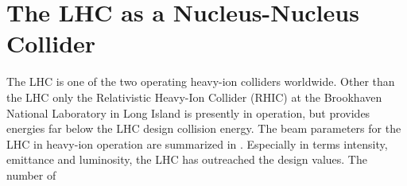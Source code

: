 
\section{The LHC as a Nucleus-Nucleus Collider}

The LHC is one of the two operating heavy-ion colliders worldwide. Other than the LHC only the Relativistic Heavy-Ion Collider (RHIC) at the Brookhaven National Laboratory in Long Island is presently in operation, but provides energies far below the LHC design collision energy. The beam parameters for the LHC in heavy-ion operation are summarized in . Especially in terms intensity, emittance and luminosity, the LHC has outreached the design values. The number of 

